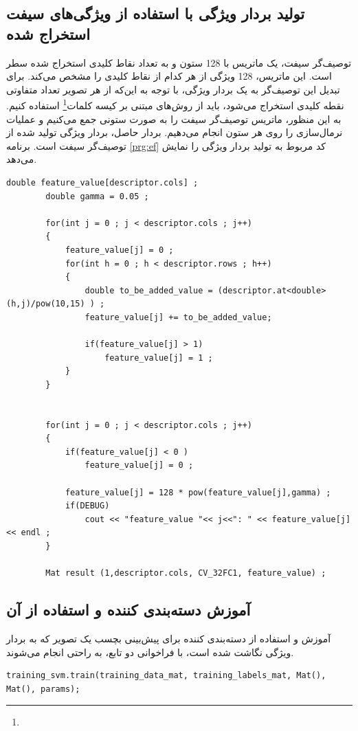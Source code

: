 \documentclass[11.5pt,a4paper]{article}
\newcommand{\enfootnote}[1]{\footnote{\lr{#1}}}
\begin{document}
 
\subsection{تولید بردار ویژگی با استفاده از ویژگی‌های سیفت استخراج شده}

توصیف‌گر سیفت، یک ماتریس با 128 ستون و به تعداد نقاط کلیدی استخراج شده سطر است. این ماتریس، 128 ویژگی از هر کدام از نقاط کلیدی را مشخص می‌کند. برای تبدیل این توصیف‌گر به یک بردار ویژگی، با توجه به این‌که از هر تصویر تعداد متفاوتی نقطه کلیدی استخراج می‌شود، باید از روش‌های مبتنی بر کیسه کلمات\enfootnote{bag of words} استفاده کنیم. به این منظور، ماتریس توصیف‌گر سیفت را به صورت ستونی جمع می‌کنیم و عملیات نرمال‌سازی را روی هر ستون انجام می‌دهیم. بردار حاصل، بردار ویژگی تولید شده از توصیف‌گر سیفت است. برنامه \ref{prg:ef} کد مربوط به تولید بردار ویژگی را نمایش می‌دهد.


 \begin{LTR}
    \begin{lstlisting}[style=C++Style,caption=\rl{تولید بردار ویژگی}]
		double feature_value[descriptor.cols] ;
		double gamma = 0.05 ;

		for(int j = 0 ; j < descriptor.cols ; j++)
		{
			feature_value[j] = 0 ;
			for(int h = 0 ; h < descriptor.rows ; h++)
			{
				double to_be_added_value = (descriptor.at<double>(h,j)/pow(10,15) ) ;
				feature_value[j] += to_be_added_value;

				if(feature_value[j] > 1)
					feature_value[j] = 1 ;
			}	
		}


		for(int j = 0 ; j < descriptor.cols ; j++)
		{
			if(feature_value[j] < 0 )
				feature_value[j] = 0 ;

			feature_value[j] = 128 * pow(feature_value[j],gamma) ;
			if(DEBUG)
				cout << "feature_value "<< j<<": " << feature_value[j] << endl ; 
		}

		Mat result (1,descriptor.cols, CV_32FC1, feature_value) ;
    \end{lstlisting}
    \label{prg:ef}
  \end{LTR}


\subsection{آموزش دسته‌بندی کننده و استفاده از آن}
آموزش و استفاده از دسته‌بندی کننده برای پیش‌بینی بچسب یک تصویر که به بردار ویژگی نگاشت شده است، با فراخوانی دو تابع، به راحتی انجام می‌شوند.

 \begin{LTR}
    \begin{lstlisting}[style=C++Style,caption=\rl{آموزش دسته‌بندی کننده}]
	training_svm.train(training_data_mat, training_labels_mat, Mat(), Mat(), params);
    \end{lstlisting}
    \label{prg:svmtrn}
  \end{LTR}
  
\end{document}
